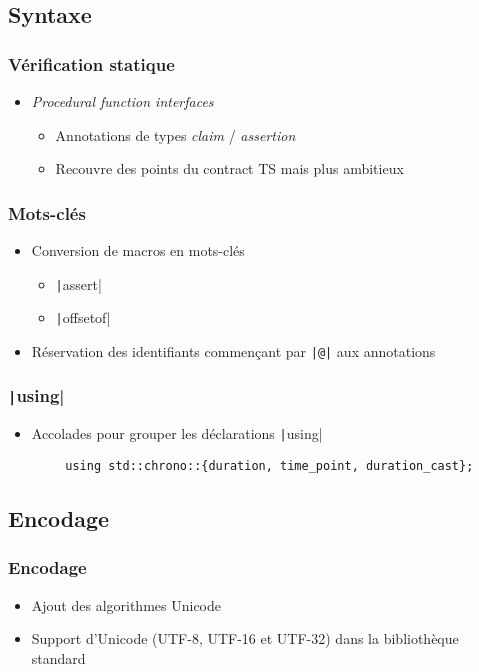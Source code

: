 \documentclass[C++.tex]{subfiles}
\begin{document}
\subsection*{Syntaxe}
\begin{frame}[fragile]
	\frametitle{Vérification statique}
	\begin{itemize}
		\item \textit{Procedural function interfaces}
		\begin{itemize}
			\item Annotations de types \textit{claim} / \textit{assertion}
			\item Recouvre des points du contract TS mais plus ambitieux
		\end{itemize}
	\end{itemize}
\end{frame}

\begin{frame}[fragile]
	\frametitle{Mots-clés}
	\begin{itemize}
		\item Conversion de macros en mots-clés
		\begin{itemize}
			\item \texttt|assert|
			\item \texttt|offsetof|
		\end{itemize}
		\item Réservation des identifiants commençant par \texttt{|@|} aux annotations
	\end{itemize}

\end{frame}

\begin{frame}[fragile]
	\frametitle{\texttt|using|}
	\begin{itemize}
		\item Accolades pour grouper les déclarations  \texttt|using|
	\end{itemize}

	\begin{verbatim}
		using std::chrono::{duration, time_point, duration_cast};
	\end{verbatim}

\end{frame}


\subsection*{Encodage}
\begin{frame}[fragile]
	\frametitle{Encodage}
	\begin{itemize}
		\item Ajout des algorithmes Unicode


		\item Support d'Unicode (UTF-8, UTF-16 et UTF-32) dans la bibliothèque standard
	\end{itemize}
\end{frame}
\end{document}
